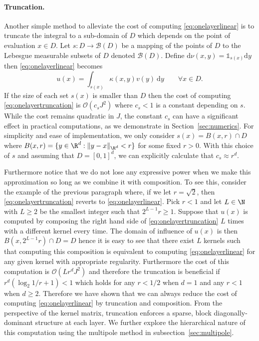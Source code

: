 \paragraph{Truncation. }
Another simple method to alleviate the cost of computing \eqref{eq:onelayerlinear} is to truncate the integral to a sub-domain of \(D\) which depends on the point of evaluation \(x \in D\). Let \(s : D \to \mathcal{B}(D)\) be a mapping of the points of \(D\) to the Lebesgue measurable subsets of \(D\) denoted \(\mathcal{B}(D)\). Define \(\text{d} \nu (x,y) = \mathds{1}_{s(x)} \text{d}y\) then \eqref{eq:onelayerlinear} becomes
\begin{equation}
    \label{eq:onelayertruncation}
    u(x) = \int_{s(x)} \kappa(x,y) v(y) \: \text{d} y \qquad \forall x \in D.
\end{equation}
If the size of each set \(s(x)\) is smaller than \(D\) then the cost of computing \eqref{eq:onelayertruncation} is \(\mathcal{O}(c_sJ^2)\) where \(c_s  < 1\) is a constant depending on \(s\). While the cost remains quadratic in \(J\), the constant \(c_s\) can have a significant effect in practical computations, as we demonstrate in Section~\ref{sec:numerics}. For simplicity and ease of implementation, we only consider \(s(x) = B(x,r) \cap D\) where \(B(x,r) = \{y \in \R^d : \|y - x\|_{\R^d} < r\}\) for some fixed \(r > 0\). With this choice of \(s\) and assuming that \(D = [0,1]^d\), we can explicitly calculate that \(c_s \approx r^d\).

Furthermore notice that we do not lose any expressive power when we make this approximation so long as we combine it with composition. To see this, consider the example of the previous paragraph where, if we let \(r=\sqrt{2}\),  then \eqref{eq:onelayertruncation} reverts to \eqref{eq:onelayerlinear}. Pick 
\(r < 1\) and let \(L \in \N\) with \(L \geq 2\) be the smallest integer such that \(2^{L-1}r \geq 1\). Suppose that \(u(x)\) is computed by composing the right hand side of \eqref{eq:onelayertruncation} \(L\) times with a different kernel every time. The domain of influence of \(u(x)\) is then \(B(x,2^{L-1}r) \cap D = D\) hence it is easy to see that there exist \(L\) kernels such that computing this composition is equivalent to computing \eqref{eq:onelayerlinear} for any given kernel with appropriate regularity. Furthermore the cost of this computation is \(\mathcal{O}(Lr^d J^2)\) and therefore the truncation is beneficial if \(r^d (\log_2 1/r + 1) < 1\)
which holds for any \(r < 1/2\) when \(d = 1\) and any \(r < 1\) when \(d \geq 2\). Therefore we have shown that we can always reduce the cost of computing \eqref{eq:onelayerlinear} by truncation and composition. From the perspective of the kernel matrix, truncation enforces a sparse, block diagonally-dominant structure at each layer. We further explore the hierarchical nature of this computation using the multipole method in subsection~\ref{sec:multipole}.

